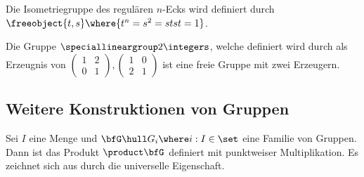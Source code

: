 \begin{examples}
    \item Die Isometriegruppe des regulären $n$-Ecks wird definiert durch
$\freeobject{t,s}\where{t^n=s^2=stst=1}$.
    \item Die Gruppe $\speciallineargroup 2 \integers$, welche definiert wird durch als
Erzeugnis von
$
\begin{pmatrix}
    1 & 2 \\
    0 & 1
\end{pmatrix},
\begin{pmatrix}
    1 & 0 \\
    2 & 1 
\end{pmatrix}
$
ist eine freie Gruppe mit zwei Erzeugern.
\end{examples}

\subsection{Weitere Konstruktionen von Gruppen}

\begin{definition}
    Sei $I$ eine Menge und $\bfG \hull G_i\where i:I\in\set$ eine Familie von Gruppen. Dann ist das
    Produkt $\product \bfG$ definiert mit punktweiser Multiplikation. Es zeichnet sich aus durch
    die universelle Eigenschaft.
\end{definition}


